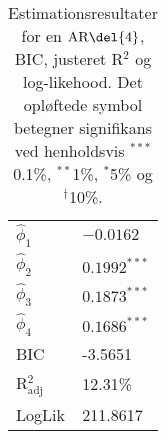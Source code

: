 \begin{table}[h]
\center
\begin{tabular}{ll}
\toprule
$\widehat{\phi}_1$ &$ -0.0162 $ \\
$\widehat{\phi}_2$ & $0.1992^{***}$  \\
$\widehat{\phi}_3$ &$0.1873^{***}$  \\
$\widehat{\phi}_4$ &$0.1686^{***} $ \\ \midrule
BIC & -3.5651 \\
 R$^2_{\text{adj}}$ & 12.31\% \\
LogLik &  211.8617\\ \bottomrule
 \end{tabular}
\caption{Estimationsresultater for en \(\text{AR} \del{4}\), BIC, justeret R$^2$ og log-likehood. Det opløftede symbol betegner signifikans ved henholdsvis $^{***}$0.1\%, $^{**}$1\%, $^{*}$5\% og $^{\dagger}$10\%.} \label{tab:est_ar}
\end{table}